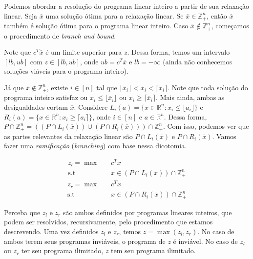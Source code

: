 \documentclass[]{article}
\numberwithin{equation}{section}
\begin{document}
Podemos abordar a resolução do programa linear inteiro a partir de sua relaxação linear.
Seja $\overline{x}$ uma solução ótima para a relaxação linear.
Se $\overline{x} \in \mathbb{Z}_+^n$, então $\overline{x}$ também é solução ótima para o programa linear
inteiro.
Caso $\overline{x} \notin \mathbb{Z}_+^n$, começamos o procedimento de \emph{branch and bound}.

Note que $c^T\overline{x}$ é um limite superior para $z$.
Dessa forma, temos um intervalo $[lb, ub]$ com $z \in [lb, ub]$, onde $ub = c^T\overline{x}$ e
$lb = -\infty$ (ainda não conhecemos soluções viáveis para o programa inteiro).

Já que $\overline{x} \notin \mathbb{Z}_+^n$, existe $i \in [n]$ tal que
$\lfloor \overline{x}_i \rfloor < \overline{x}_i < \lceil \overline{x}_i \rceil$.
Note que toda solução do programa inteiro satisfaz ou $x_i \leq \lfloor \overline{x}_i \rfloor$ ou
$x_i \geq \lceil \overline{x}_i \rceil$.
Mais ainda, ambas as desigualdades cortam $\overline{x}$.
Considere $L_i(a) = \{x \in \mathbb{R}^n : x_i \leq \lfloor a_i \rfloor\}$ e
$R_i(a) = \{x \in \mathbb{R}^n : x_i \geq \lceil a_i \rceil\}$, onde $i \in [n]$ e $a \in \mathbb{R}^n$.
Dessa forma,
$P \cap \mathbb{Z}_+^n = ((P \cap L_i(\overline{x})) \cup (P \cap R_i(\overline{x}))) \cap \mathbb{Z}_+^n$.
Com isso, podemos ver que as partes relevantes da relaxação linear são $P \cap L_i(\overline{x})$ e
$P \cap R_i(\overline{x})$.
Vamos fazer uma \emph{ramificação} (\emph{branching}) com base nessa dicotomia.

\begin{align}
z_l = \max        &\quad  c^Tx                        \\
      \text{s.t}  &\quad  x \in (P \cap L_i(\overline{x})) \cap \mathbb{Z}_+^n
\end{align}
\begin{align}
z_r = \max        &\quad  c^Tx                        \\
      \text{s.t}  &\quad  x \in (P \cap R_i(\overline{x})) \cap \mathbb{Z}_+^n
\end{align}

Perceba que $z_l$ e $z_r$ são ambos definidos por programas lineares inteiros, que podem ser resolvidos,
recursivamente, pelo procedimento que estamos descrevendo.
Uma vez definidos $z_l$ e $z_r$, temos $z = \max (z_l, z_r)$.
No caso de ambos terem seus programas inviáveis, o programa de $z$ é inviável.
No caso de $z_l$ ou $z_r$ ter seu programa ilimitado, $z$ tem seu programa ilimitado.
\end{document}
